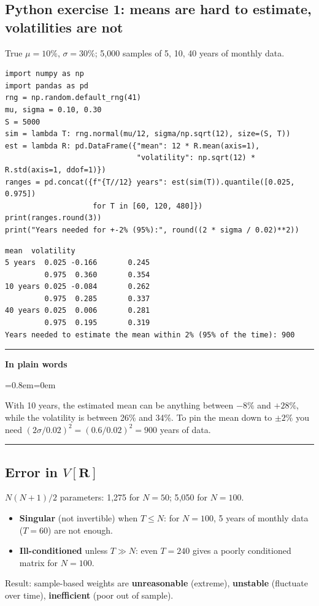 \documentclass[11pt,a4paper]{report}
\newenvironment{notebox}[1]
  {\par\medskip\Needspace{6\baselineskip}\noindent\rule{\linewidth}{0.4pt}\par\nopagebreak
   \noindent\textbf{#1}\par\nopagebreak
   \begin{list}{}{\leftmargin=0.8em\rightmargin=0em\topsep=2pt}\item[]}
  {\end{list}\nopagebreak\noindent\rule{\linewidth}{0.4pt}\par\medskip}
\newenvironment{plainbox}{\begin{notebox}{In plain words}}{\end{notebox}}
\newcommand{\R}{\bm{R}}
\begin{document}
\subsection*{Python exercise 1: means are hard to estimate, volatilities are not}
True $\mu=10\%$, $\sigma=30\%$; 5{,}000 samples of 5, 10, 40 years of monthly data.
\begin{lstlisting}
import numpy as np
import pandas as pd
rng = np.random.default_rng(41)
mu, sigma = 0.10, 0.30
S = 5000
sim = lambda T: rng.normal(mu/12, sigma/np.sqrt(12), size=(S, T))
est = lambda R: pd.DataFrame({"mean": 12 * R.mean(axis=1),
                              "volatility": np.sqrt(12) * R.std(axis=1, ddof=1)})
ranges = pd.concat({f"{T//12} years": est(sim(T)).quantile([0.025, 0.975])
                    for T in [60, 120, 480]})
print(ranges.round(3))
print("Years needed for +-2% (95%):", round((2 * sigma / 0.02)**2))
\end{lstlisting}
\begin{lstlisting}[style=out]
                 mean  volatility
5 years  0.025 -0.166       0.245
         0.975  0.360       0.354
10 years 0.025 -0.084       0.262
         0.975  0.285       0.337
40 years 0.025  0.006       0.281
         0.975  0.195       0.319
Years needed to estimate the mean within 2% (95% of the time): 900
\end{lstlisting}
\begin{plainbox}
With 10 years, the estimated mean can be anything between $-8\%$ and $+28\%$,
while the volatility is between 26\% and 34\%. To pin the mean down to $\pm2\%$
you need $(2\sigma/0.02)^2=(0.6/0.02)^2=900$ years of data.
\end{plainbox}

\subsection{Error in $V[\R]$}
$N(N+1)/2$ parameters: 1{,}275 for $N=50$; 5{,}050 for $N=100$.
\begin{itemize}
  \item \textbf{Singular} (not invertible) when $T\le N$: for $N=100$, 5 years of monthly data ($T=60$) are not enough.
  \item \textbf{Ill-conditioned} unless $T\gg N$: even $T=240$ gives a poorly conditioned matrix for $N=100$.
\end{itemize}
Result: sample-based weights are \textbf{unreasonable} (extreme), \textbf{unstable}
(fluctuate over time), \textbf{inefficient} (poor out of sample).
\end{document}
